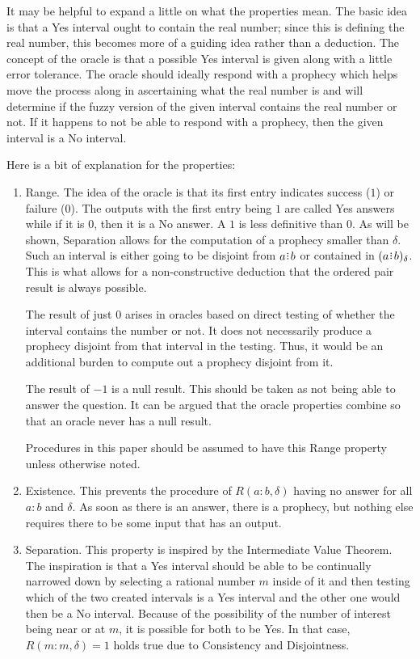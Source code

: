 \documentclass[12pt]{article}
\begin{document}
It may be helpful to expand a little on what the properties mean. The basic idea is that a Yes interval ought to contain the real number; since this is defining the real number, this becomes more of a guiding idea rather than a deduction. The concept of the oracle is that a possible Yes interval is given along with a little error tolerance. The oracle should ideally respond with a prophecy which helps move the process along in ascertaining what the real number is and will determine if the fuzzy version of the given interval contains the real number or not. If it happens to not be able to respond with a prophecy, then the given interval is a No interval. 

Here is a bit of explanation for the properties: 
\begin{enumerate}
    \item Range. The idea of the oracle is that its first entry indicates success ($1$) or failure ($0$). The outputs with the first entry being $1$ are called Yes answers while if it is $0$, then it is a No answer. A $1$ is less definitive than $0$. As will be shown, Separation allows for the computation of a prophecy smaller than $\delta$. Such an interval is either going to be disjoint from $a \rint b$ or contained in $\halo{a\rint b}$. This is what allows for a non-constructive deduction that the ordered pair result is always possible. 

    The result of just $0$ arises in oracles based on direct testing of whether the interval contains the number or not. It does not necessarily produce a prophecy disjoint from that interval in the testing. Thus, it would be an additional burden to compute out a prophecy disjoint from it. 

    The result of $-1$ is a null result. This should be taken as not being able to answer the question. It can be argued that the oracle properties combine so that an oracle never has a null result. 

    Procedures in this paper should be assumed to have this Range property unless otherwise noted. 

    \item Existence. This prevents the procedure of $R(a:b, \delta)$ having no answer for all $a:b$ and $\delta$. As soon as there is an answer, there is a prophecy, but nothing else requires there to be some input that has an output. 

    \item Separation. This property is inspired by the Intermediate Value Theorem. The inspiration is that a Yes interval should be able to be continually narrowed down by selecting a rational number $m$ inside of it and then testing which of the two created intervals is a Yes interval and the other one would then be a No interval. Because of the possibility of the number of interest being near or at $m$, it is possible for both to be Yes. In that case, $R(m:m, \delta) = 1$ holds true due to Consistency and Disjointness. 
    

\end{enumerate}
\end{document}
